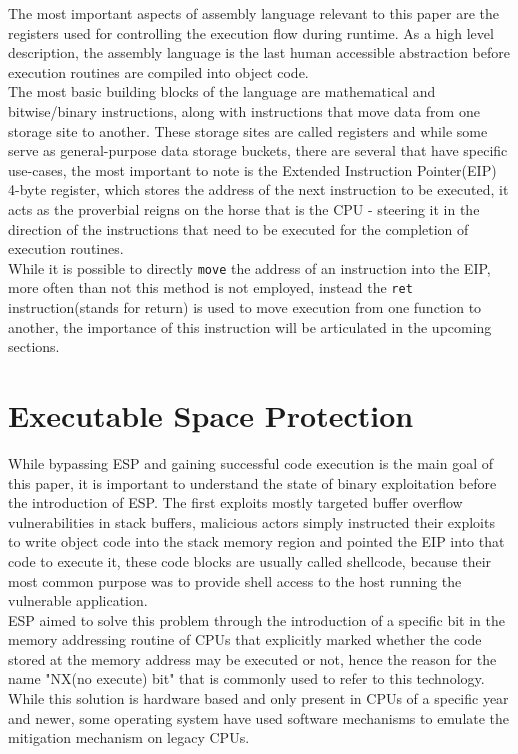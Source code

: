 \documentclass[a4paper,9pt]{report}
\begin{document}
The most important aspects of assembly language relevant to this paper are the registers used for controlling the execution flow during runtime. As a high level description, the assembly language is the last human accessible abstraction before execution routines are compiled into object code.\\

The most basic building blocks of the language are mathematical and bitwise/binary instructions, along with instructions that move data from one storage site to another. These storage sites are called registers and while some serve as general-purpose data storage buckets, there are several that have specific use-cases, the most important to note is the Extended Instruction Pointer(EIP) 4-byte register, which stores the address of the next instruction to be executed, it acts as the proverbial reigns on the horse that is the CPU - steering it in the direction of the instructions that need to be executed for the completion of execution routines.\\

While it is possible to directly \texttt{move} the address of an instruction into the EIP, more often than not this method is not employed, instead the \texttt{ret} instruction(stands for return) is used to move execution from one function to another, the importance of this instruction will be articulated in the upcoming sections.\\


\section{Executable Space Protection}
\label{sec:org3a7a496}

While bypassing ESP and gaining successful code execution is the main goal of this paper, it is important to understand the state of binary exploitation before the introduction of ESP. The first exploits mostly targeted buffer overflow vulnerabilities in stack buffers, malicious actors simply instructed their exploits to write object code into the stack memory region and pointed the EIP into that code to execute it, these code blocks are usually called shellcode, because their most common purpose was to provide shell access to the host running the vulnerable application.\\

ESP aimed to solve this problem through the introduction of a specific bit in the memory addressing routine of CPUs that explicitly marked whether the code stored at the memory address may be executed or not, hence the reason for the name "NX(no execute) bit" that is commonly used to refer to this technology. While this solution is hardware based and only present in CPUs of a specific year and newer, some operating system have used software mechanisms to emulate the mitigation mechanism on legacy CPUs.\\
\end{document}
